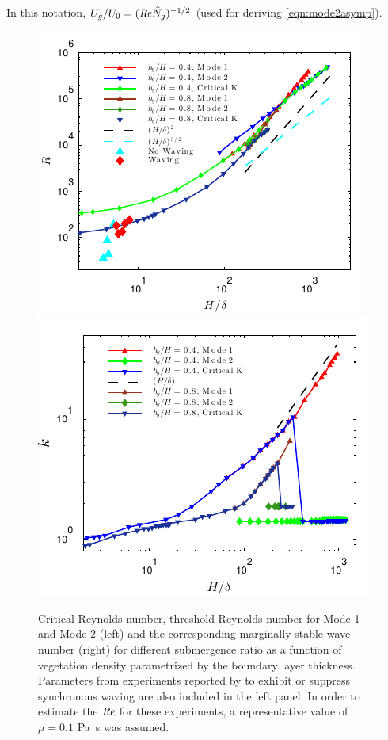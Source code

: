 \documentclass{jfm}
\newcommand{\Ndg}{\tilde{N}_g}
\begin{document}
In this notation, $U_g/U_0 = (\Rey \Ndg)^{-1/2}$ (used for deriving \eqref{eqn:mode2asymp}). 
\begin{figure}
\begin{center}
\includegraphics[scale = 0.95]{new_graph_R_vs_delta}\includegraphics[scale = 0.95]{new_graph_K_vs_delta}
\end{center}
\caption{
Critical Reynolds number, threshold Reynolds number for Mode 1 and Mode 2 (left) and the corresponding marginally stable wave number (right) for different submergence ratio as a function of vegetation density parametrized by the boundary layer thickness. 
Parameters from experiments reported by \cite{Ghisal02} to exhibit or suppress synchronous waving are also included in the left panel. 
In order to estimate the $\mbox{\textit{Re}}$ for these experiments, a representative value of $\mu=0.1$ Pa~s was assumed.
}
\label{Re_vs_delta}
\end{figure}
\end{document}
